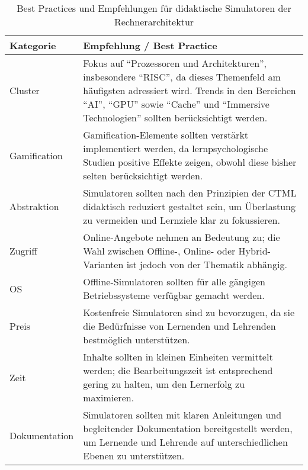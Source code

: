 \begin{table}[ht]
	\centering
	\caption{Best Practices und Empfehlungen für didaktische Simulatoren der Rechnerarchitektur}
	\label{tab:best_practices}
	\begin{tabular}{p{4cm}p{10cm}}
		\toprule
		\textbf{Kategorie} & \textbf{Empfehlung / Best Practice} \\
		\midrule
		Cluster & Fokus auf \enquote{Prozessoren und Architekturen}, insbesondere \enquote{RISC}, da dieses Themenfeld am häufigsten adressiert wird. Trends in den Bereichen \enquote{AI}, \enquote{GPU} sowie \enquote{Cache} und \enquote{Immersive Technologien} sollten berücksichtigt werden. \\[0.3cm]

		Gamification & Gamification-Elemente sollten verstärkt implementiert werden, da lernpsychologische Studien positive Effekte zeigen, obwohl diese bisher selten berücksichtigt werden. \\[0.3cm]

		Abstraktion & Simulatoren sollten nach den Prinzipien der \ac{CTML} didaktisch reduziert gestaltet sein, um Überlastung zu vermeiden und Lernziele klar zu fokussieren. \\[0.3cm]

		Zugriff & Online-Angebote nehmen an Bedeutung zu; die Wahl zwischen Offline-, Online- oder Hybrid-Varianten ist jedoch von der Thematik abhängig. \\[0.3cm]

		OS & Offline-Simulatoren sollten für alle gängigen Betriebssysteme verfügbar gemacht werden. \\[0.3cm]

		Preis & Kostenfreie Simulatoren sind zu bevorzugen, da sie die Bedürfnisse von Lernenden und Lehrenden bestmöglich unterstützen. \\[0.3cm]

		Zeit & Inhalte sollten in kleinen Einheiten vermittelt werden; die Bearbeitungszeit ist entsprechend gering zu halten, um den Lernerfolg zu maximieren. \\[0.3cm]

		Dokumentation & Simulatoren sollten mit klaren Anleitungen und begleitender Dokumentation bereitgestellt werden, um Lernende und Lehrende auf unterschiedlichen Ebenen zu unterstützen. \\
		\bottomrule
	\end{tabular}
\end{table}

